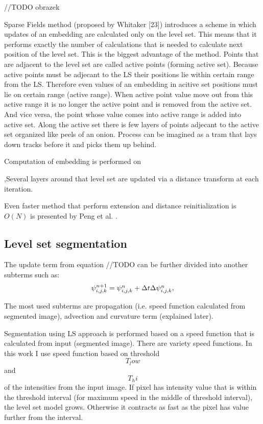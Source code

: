 //TODO obrazek

Sparse Fields method (proposed by Whitaker [23]) introduces a scheme in which updates of an embedding are calculated only on the level set. This means that it performs exactly the number of calculations that is needed to calculate next position of the level set. This is the biggest advantage of the method. Points that are adjacent to the level set are called active points (forming active set). Because active points must be adjecant to the LS their positions lie within certain range from the LS. Therefore even values of an embedding in acitive set positions must lie on certain range (active range). When active point value move out from this active range it is no longer the active point and is removed from the active set. And vice versa, the point whose value comes into active range is added into active set. Along the active set there is few layers of points adjecant to the active set organized like peels of an onion. 
Process can be imagined as a tram that lays down tracks before it and picks them up behind.

 Computation of embedding is performed on 

,Several layers around that level set are updated via a distance transform at each iteration.

Even faster method that perform extension and distance reinitialization is $O(N)$ is presented by Peng et al. \cite{pengSparseFields}.

\subsection{Level set segmentation}

The update term from equation //TODO can be further divided into another subterms such as:
\begin{equation}
$$\psi_{i,j,k}^{n+1} = \psi_{i,j,k}^{n} + \Delta t \Delta \psi_{i,j,k}^{n}$$,
\end{equation}

The most used subterms are propagation (i.e. speed function calculated from segmented image), advection and curvature term (explained later).

Segmentation using LS approach is performed based on a speed function that is calculated from input (segmented image). There are variety speed functions. In this work I use speed function based on threshold $$T_low$$ and $$T_hi$$ of the intensities from the input image. If pixel has intensity value that is within the threshold interval (for maximum speed in the middle of threshold interval), the level set model grows. Otherwise it contracts as fast as the pixel has value further from the interval.

